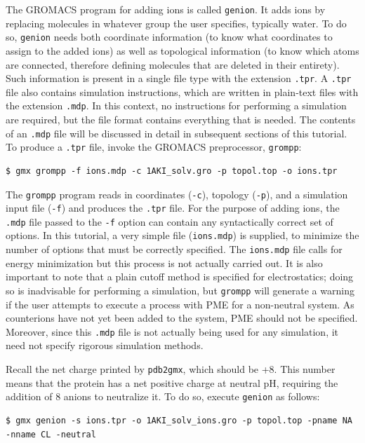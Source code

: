 \documentclass[9pt,tutorial,pubversion]{livecoms}
\begin{document}
The GROMACS program for adding ions is called \texttt{genion}. It adds ions by replacing molecules in whatever group the user specifies, typically water. To do so, \texttt{genion} needs both coordinate information (to know what coordinates to assign to the added ions) as well as topological information (to know which atoms are connected, therefore defining molecules that are deleted in their entirety). Such information is present in a single file type with the extension \texttt{.tpr}. A \texttt{.tpr} file also contains simulation instructions, which are written in plain-text files with the extension \texttt{.mdp}. In this context, no instructions for performing a simulation are required, but the file format contains everything that is needed. The contents of an \texttt{.mdp} file will be discussed in detail in subsequent sections of this tutorial. To produce a \texttt{.tpr} file, invoke the GROMACS preprocessor, \texttt{grompp}:

\begin{lstlisting}
$ gmx grompp -f ions.mdp -c 1AKI_solv.gro -p topol.top -o ions.tpr
\end{lstlisting}

The \texttt{grompp} program reads in coordinates (\texttt{-c}), topology (\texttt{-p}), and a simulation input file (\texttt{-f}) and produces the \texttt{.tpr} file. For the purpose of adding ions, the \texttt{.mdp} file passed to the \texttt{-f} option can contain any syntactically correct set of options. In this tutorial, a very simple file (\texttt{ions.mdp}) is supplied, to minimize the number of options that must be correctly specified. The \texttt{ions.mdp} file calls for energy minimization but this process is not actually carried out. It is also important to note that a plain cutoff method is specified for electrostatics; doing so is inadvisable for performing a simulation, but \texttt{grompp} will generate a warning if the user attempts to execute a process with PME for a non-neutral system. As counterions have not yet been added to the system, PME should not be specified. Moreover, since this \texttt{.mdp} file is not actually being used for any simulation, it need not specify rigorous simulation methods.

Recall the net charge printed by \texttt{pdb2gmx}, which should be +8. This number means that the protein has a net positive charge at neutral pH, requiring the addition of 8 anions to neutralize it. To do so, execute \texttt{genion} as follows:

\begin{lstlisting}
$ gmx genion -s ions.tpr -o 1AKI_solv_ions.gro -p topol.top -pname NA -nname CL -neutral
\end{lstlisting}
\end{document}
